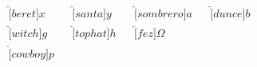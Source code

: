 \documentclass{article}
\begin{document}
\vspace*{-9mm}
\begin{align*}
\hat[beret]{x}&&
\hat[santa]{y}&&
\hat[sombrero]{a}&&
\hat[dunce]{b}\\
\hat[witch]{g}&&
\hat[tophat]{h}&&
\hat[fez]{\Omega}\\
\hat[cowboy]{p}
\end{align*}
\end{document}
